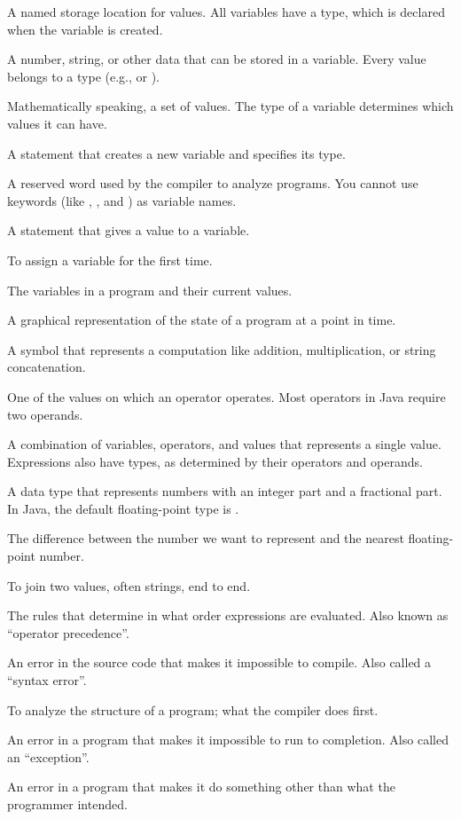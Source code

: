 \begin{description}

A named storage location for values.
All variables have a type, which is declared when the variable is created.

A number, string, or other data that can be stored in a variable.
Every value belongs to a type (e.g.,  or ).

Mathematically speaking, a set of values.
The type of a variable determines which values it can have.

A statement that creates a new variable and specifies its type.

A reserved word used by the compiler to analyze programs.
You cannot use keywords (like , , and ) as variable names.

A statement that gives a value to a variable.

To assign a variable for the first time.


The variables in a program and their current values.

A graphical representation of the state of a program at a point in time.

A symbol that represents a computation like addition, multiplication, or string concatenation.

One of the values on which an operator operates.
Most operators in Java require two operands.

A combination of variables, operators, and values that represents a single value.
Expressions also have types, as determined by their operators and operands.

A data type that represents numbers with an integer part and a fractional part.
In Java, the default floating-point type is .

The difference between the number we want to represent and the nearest floating-point number.

To join two values, often strings, end to end.

The rules that determine in what order expressions are evaluated.
Also known as ``operator precedence''.

An error in the source code that makes it impossible to compile.
Also called a ``syntax error''.

To analyze the structure of a program; what the compiler does first.

An error in a program that makes it impossible to run to completion.
Also called an ``exception''.

An error in a program that makes it do something other than what the programmer intended.

\end{description}


